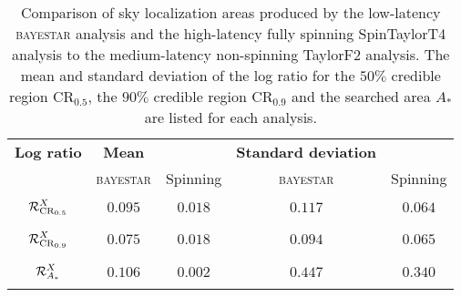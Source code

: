 \begin{table}
\begin{tabular}{ccccc}
\textbf{Log ratio} & \textbf{Mean} & & \textbf{Standard deviation} & \\   
 & \textsc{bayestar} & Spinning & \textsc{bayestar} & Spinning \\
$\displaystyle \vphantom{\frac{0}{0}} \mathcal{R}^X_{\mathrm{CR}_{0.5}}$ & $0.095$ & $0.018$ & $0.117$ & $0.064$ \\
$\displaystyle \vphantom{\frac{0}{0}} \mathcal{R}^X_{\mathrm{CR}_{0.9}}$ & $0.075$ & $0.018$ & $0.094$ & $0.065$ \\
$\displaystyle \vphantom{\frac{0}{0}} \mathcal{R}^X_{A_\ast}$ & $0.106$ & $0.002$ & $0.447$ & $0.340$
\end{tabular}
\caption{\label{tab:sky-ratio} Comparison of sky localization areas produced by the low-latency \textsc{bayestar} analysis and the high-latency fully spinning SpinTaylorT4 analysis to the medium-latency non-spinning TaylorF2 analysis. The mean and standard deviation of the log ratio for the $50\%$ credible region $\mathrm{CR}_{0.5}$, the $90\%$ credible region $\mathrm{CR}_{0.9}$ and the searched area $A_\ast$ are listed for each analysis.}

\end{table}